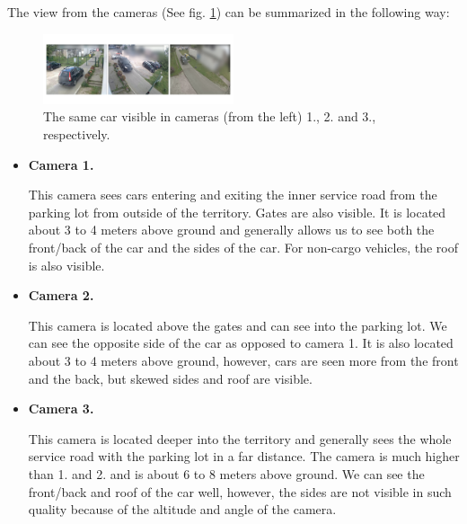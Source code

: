 \documentclass[conference]{IEEEtran} %
\begin{document}
				The view from the cameras (See fig. \ref{fig:fig4}) can be summarized in the following way:
				
				\begin{figure}[b]
					\centering
					\includegraphics[width=0.5\textwidth]{re_id_diagramma_4.png} %
					\caption{The same car visible in cameras (from the left) 1., 2. and 3., respectively.}
					\label{fig:fig4} %
				\end{figure}
				
				\begin{itemize}
					\item \textbf{Camera 1.}
					
					This camera sees cars entering and exiting the inner service road from the parking lot from outside of the territory. Gates are also visible. It is located about 3 to 4 meters above ground and generally allows us to see both the front/back of the car and the sides of the car. For non-cargo vehicles, the roof is also visible.
					
					\item \textbf{Camera 2.}
					
					This camera is located above the gates and can see into the parking lot. We can see the opposite side of the car as opposed to camera 1. It is also located about 3 to 4 meters above ground, however, cars are seen more from the front and the back, but skewed sides and roof are visible.
					
					\item \textbf{Camera 3.}

					This camera is located deeper into the territory and generally sees the whole service road with the parking lot in a far distance. The camera is much higher than 1. and 2. and is about 6 to 8 meters above ground. We can see the front/back and roof of the car well, however, the sides are not visible in such quality because of the altitude and angle of the camera.\newline
					
				\end{itemize}
		
\end{document}
